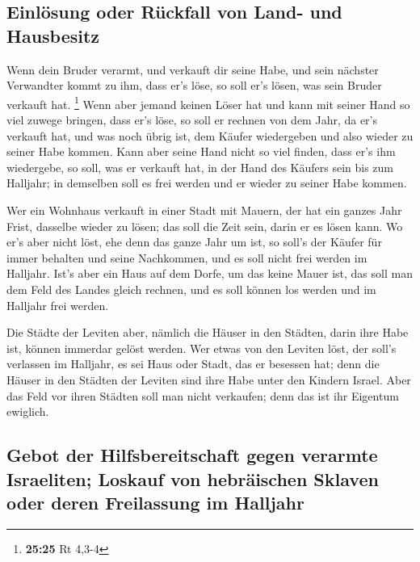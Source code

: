 \hypertarget{einluxf6sung-oder-ruxfcckfall-von-land--und-hausbesitz}{%
\subsection{Einlösung oder Rückfall von Land- und
Hausbesitz}\label{einluxf6sung-oder-ruxfcckfall-von-land--und-hausbesitz}}

 Wenn dein Bruder verarmt, und verkauft dir seine Habe,
und sein nächster Verwandter kommt zu ihm, dass er's löse, so soll er's
lösen, was sein Bruder verkauft hat. \footnote{\textbf{25:25} Rt 4,3-4}
 Wenn aber jemand keinen Löser hat und kann mit seiner
Hand so viel zuwege bringen, dass er's löse,  so soll er
rechnen von dem Jahr, da er's verkauft hat, und was noch übrig ist, dem
Käufer wiedergeben und also wieder zu seiner Habe kommen.
 Kann aber seine Hand nicht so viel finden, dass er's ihm
wiedergebe, so soll, was er verkauft hat, in der Hand des Käufers sein
bis zum Halljahr; in demselben soll es frei werden und er wieder zu
seiner Habe kommen.

 Wer ein Wohnhaus verkauft in einer Stadt mit Mauern, der
hat ein ganzes Jahr Frist, dasselbe wieder zu lösen; das soll die Zeit
sein, darin er es lösen kann.  Wo er's aber nicht löst,
ehe denn das ganze Jahr um ist, so soll's der Käufer für immer behalten
und seine Nachkommen, und es soll nicht frei werden im Halljahr.
 Ist's aber ein Haus auf dem Dorfe, um das keine Mauer
ist, das soll man dem Feld des Landes gleich rechnen, und es soll können
los werden und im Halljahr frei werden.

 Die Städte der Leviten aber, nämlich die Häuser in den
Städten, darin ihre Habe ist, können immerdar gelöst werden.
 Wer etwas von den Leviten löst, der soll's verlassen im
Halljahr, es sei Haus oder Stadt, das er besessen hat; denn die Häuser
in den Städten der Leviten sind ihre Habe unter den Kindern Israel.
 Aber das Feld vor ihren Städten soll man nicht
verkaufen; denn das ist ihr Eigentum ewiglich.

\hypertarget{gebot-der-hilfsbereitschaft-gegen-verarmte-israeliten-loskauf-von-hebruxe4ischen-sklaven-oder-deren-freilassung-im-halljahr}{%
\subsection{Gebot der Hilfsbereitschaft gegen verarmte Israeliten;
Loskauf von hebräischen Sklaven oder deren Freilassung im
Halljahr}\label{gebot-der-hilfsbereitschaft-gegen-verarmte-israeliten-loskauf-von-hebruxe4ischen-sklaven-oder-deren-freilassung-im-halljahr}}

